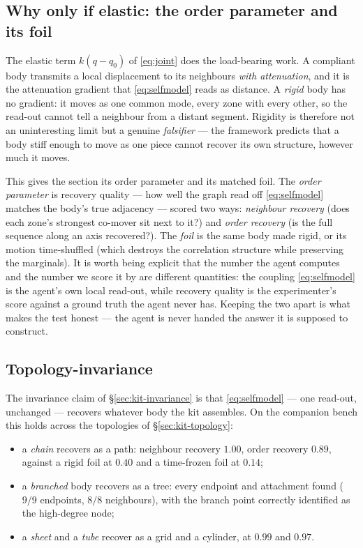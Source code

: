\documentclass{article}
\begin{document}
\subsection{Why only if elastic: the order parameter and its
foil}\label{sec:selfmodel-foil}

The elastic term $k(q-q_0)$ of \eqref{eq:joint} does the load-bearing
work.  A compliant body transmits a local displacement to its
neighbours \emph{with attenuation}, and it is the attenuation gradient
that \eqref{eq:selfmodel} reads as distance.  A \emph{rigid} body has no
gradient: it moves as one common mode, every zone with every other, so
the read-out cannot tell a neighbour from a distant segment.  Rigidity
is therefore not an uninteresting limit but a genuine \emph{falsifier}
--- the framework predicts that a body stiff enough to move as one piece
cannot recover its own structure, however much it moves.

This gives the section its order parameter and its matched foil.  The
\emph{order parameter} is recovery quality --- how well the graph read
off \eqref{eq:selfmodel} matches the body's true adjacency --- scored two
ways: \emph{neighbour recovery} (does each zone's strongest co-mover sit
next to it?) and \emph{order recovery} (is the full sequence along an
axis recovered?).  The \emph{foil} is the same body made rigid, or its
motion time-shuffled (which destroys the correlation structure while
preserving the marginals).  It is worth being explicit that the number
the agent computes and the number we score it by are different
quantities: the coupling \eqref{eq:selfmodel} is the agent's own local
read-out, while recovery quality is the experimenter's score against a
ground truth the agent never has.  Keeping the two apart is what makes
the test honest --- the agent is never handed the answer it is supposed
to construct.

\subsection{Topology-invariance}\label{sec:selfmodel-topology}

The invariance claim of \S\ref{sec:kit-invariance} is that
\eqref{eq:selfmodel} --- one read-out, unchanged --- recovers whatever
body the kit assembles.  On the companion bench this holds across the
topologies of \S\ref{sec:kit-topology}:

\begin{itemize}[itemsep=2pt]
\item a \emph{chain} recovers as a path: neighbour recovery $1.00$,
order recovery $0.89$, against a rigid foil at $0.40$ and a time-frozen
foil at $0.14$;
\item a \emph{branched} body recovers as a tree: every endpoint and
attachment found ($9/9$ endpoints, $8/8$ neighbours), with the branch
point correctly identified as the high-degree node;
\item a \emph{sheet} and a \emph{tube} recover as a grid and a cylinder,
at $0.99$ and $0.97$.
\end{itemize}
\end{document}
